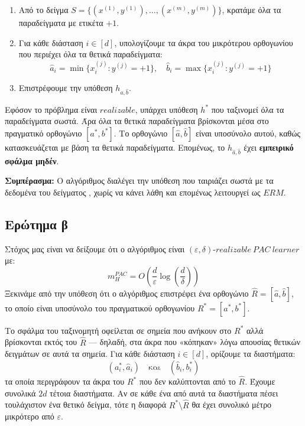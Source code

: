 \documentclass[12pt]{article}
\begin{document}
\begin{enumerate}
  \item Από το δείγμα $S = \{(x^{(1)}, y^{(1)}), \dots, (x^{(m)}, y^{(m)})\}$, κρατάμε όλα τα παραδείγματα με ετικέτα $+1$.
  \item Για κάθε διάσταση $i \in [d]$, υπολογίζουμε τα άκρα του μικρότερου ορθογωνίου που περιέχει όλα τα θετικά παραδείγματα:
  \[
  \hat{a}_i = \min \{ x_i^{(j)} : y^{(j)} = +1 \}, \quad \hat{b}_i = \max \{ x_i^{(j)} : y^{(j)} = +1 \}
  \]
  \item Επιστρέφουμε την υπόθεση $h_{\hat{a}, \hat{b}}$.
\end{enumerate}

Εφόσον το πρόβλημα είναι $realizable$, υπάρχει υπόθεση $h^*$ που ταξινομεί όλα τα παραδείγματα σωστά. Άρα όλα τα θετικά παραδείγματα βρίσκονται μέσα στο πραγματικό ορθογώνιο $[a^*, b^*]$. Το ορθογώνιο $[\hat{a}, \hat{b}]$ είναι υποσύνολο αυτού, καθώς κατασκευάζεται με βάση τα θετικά παραδείγματα. Επομένως, το $h_{\hat{a}, \hat{b}}$ έχει \textbf{εμπειρικό σφάλμα μηδέν}.

\textbf{Συμπέρασμα:} Ο αλγόριθμος διαλέγει την υπόθεση που ταιριάζει σωστά με τα δεδομένα του δείγματος , χωρίς να κάνει λάθη και επομένως λειτουργεί ως $ERM$.

\vspace{1em}
\subsection*{Ερώτημα β}

Στόχος μας είναι να δείξουμε ότι ο αλγόριθμος είναι $(\varepsilon, \delta)$-$realizable\ PAC\ learner$ με:
\[
m_H^{\text{$PAC$}} = O\left( \frac{d}{\varepsilon} \log \left( \frac{d}{\delta} \right) \right)
\]
Ξεκινάμε από την υπόθεση ότι ο αλγόριθμος επιστρέφει ένα ορθογώνιο $\hat{R} = [\hat{a}, \hat{b}]$, το οποίο είναι υποσύνολο του πραγματικού ορθογωνίου $R^* = [a^*, b^*]$.

Το σφάλμα του ταξινομητή οφείλεται σε σημεία που ανήκουν στο $R^*$ αλλά βρίσκονται εκτός του $\hat{R}$ — δηλαδή, στα άκρα που «κόπηκαν» λόγω απουσίας θετικών δειγμάτων σε αυτά τα σημεία. Για κάθε διάσταση $i \in [d]$, ορίζουμε τα διαστήματα:
\[
(a^*_i, \hat{a}_i) \quad \text{και} \quad (\hat{b}_i, b^*_i)
\]
τα οποία περιγράφουν τα άκρα του $R^*$ που δεν καλύπτονται από το $\hat{R}$. Έχουμε συνολικά $2d$ τέτοια διαστήματα. Αν σε κάθε ένα από αυτά τα διαστήματα πέσει τουλάχιστον ένα θετικό δείγμα, τότε η διαφορά $R^* \setminus \hat{R}$ θα έχει συνολικό μέτρο μικρότερο από $\varepsilon$.
\end{document}
